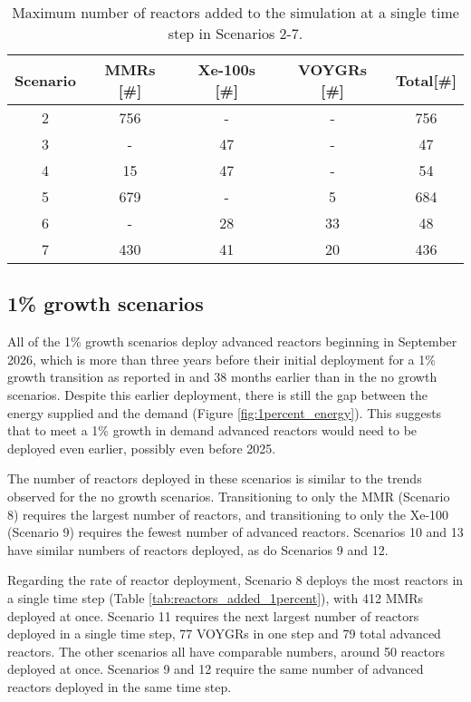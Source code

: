 \begin{table}
    \centering 
    \caption{Maximum number of reactors added to the simulation at a 
    single time step in Scenarios 2-7.}
    \label{tab:reactors_added_nogrowth}
    \begin{tabular}{c c c c c}
        \hline
        Scenario & \glspl{MMR} [\#]& Xe-100s [\#]& VOYGRs [\#]
        & Total[\#]\\\hline
        2 & 756 & - & - & 756\\
        3 & - & 47 & - & 47\\
        4 & 15 & 47 & - & 54\\
        5 & 679 & - & 5 & 684\\
        6 & - & 28 & 33 & 48\\
        7 & 430 & 41 & 20 & 436\\
        \hline
    \end{tabular}
\end{table}

\subsection{1\% growth scenarios}
All of the 1\% growth scenarios deploy advanced reactors beginning 
in September 2026, which is more 
than three years before their initial deployment for a 1\% growth 
transition as reported in \cite{bachmann_enrichment_2021} and 38 months 
earlier than in the no growth scenarios. Despite this earlier deployment, 
there is still the gap between the energy supplied and the demand 
(Figure \ref{fig:1percent_energy}). This suggests that to meet a 1\% 
growth in demand advanced reactors would need to be deployed even earlier, 
possibly even before 2025. 

The number of reactors deployed in these scenarios is similar to the 
trends observed for the no growth scenarios. Transitioning to only the 
\gls{MMR} (Scenario 8) requires the largest number of reactors, and 
transitioning to only the Xe-100 (Scenario 9) requires the fewest 
number of advanced reactors. Scenarios 10 and 13 have similar numbers of 
reactors deployed, as do Scenarios 9 and 12. 

Regarding the rate of reactor deployment, Scenario 8 deploys the most 
reactors in a single time step (Table 
\ref{tab:reactors_added_1percent}), with 412 \glspl{MMR} deployed at once. 
Scenario 11 requires the next largest number of reactors deployed in 
a single time step, 77 VOYGRs in one step and 79 total advanced reactors. 
The other scenarios all have comparable numbers, around 50 reactors 
deployed at once. Scenarios 9 and 12 require the same number of 
advanced reactors deployed in the same time step. 

